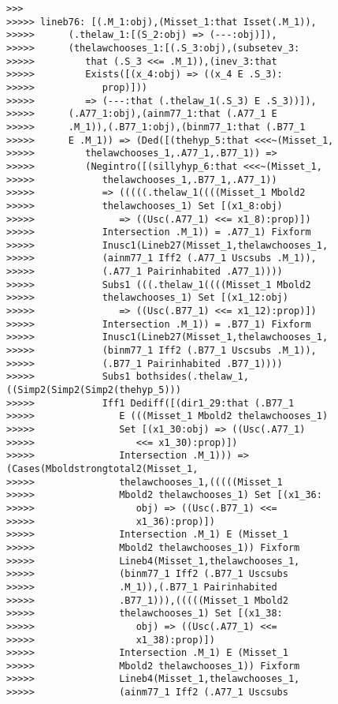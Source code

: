 \documentclass[12pt]{article}
\begin{document}
\begin{verbatim}
>>>
>>>>> lineb76: [(.M_1:obj),(Misset_1:that Isset(.M_1)),
>>>>>      (.thelaw_1:[(S_2:obj) => (---:obj)]),
>>>>>      (thelawchooses_1:[(.S_3:obj),(subsetev_3:
>>>>>         that (.S_3 <<= .M_1)),(inev_3:that
>>>>>         Exists([(x_4:obj) => ((x_4 E .S_3):
>>>>>            prop)]))
>>>>>         => (---:that (.thelaw_1(.S_3) E .S_3))]),
>>>>>      (.A77_1:obj),(ainm77_1:that (.A77_1 E
>>>>>      .M_1)),(.B77_1:obj),(binm77_1:that (.B77_1
>>>>>      E .M_1)) => (Ded([(thehyp_5:that <<<~(Misset_1,
>>>>>         thelawchooses_1,.A77_1,.B77_1)) =>
>>>>>         (Negintro([(sillyhyp_6:that <<<~(Misset_1,
>>>>>            thelawchooses_1,.B77_1,.A77_1))
>>>>>            => (((((.thelaw_1((((Misset_1 Mbold2
>>>>>            thelawchooses_1) Set [(x1_8:obj)
>>>>>               => ((Usc(.A77_1) <<= x1_8):prop)])
>>>>>            Intersection .M_1)) = .A77_1) Fixform
>>>>>            Inusc1(Lineb27(Misset_1,thelawchooses_1,
>>>>>            (ainm77_1 Iff2 (.A77_1 Uscsubs .M_1)),
>>>>>            (.A77_1 Pairinhabited .A77_1))))
>>>>>            Subs1 (((.thelaw_1((((Misset_1 Mbold2
>>>>>            thelawchooses_1) Set [(x1_12:obj)
>>>>>               => ((Usc(.B77_1) <<= x1_12):prop)])
>>>>>            Intersection .M_1)) = .B77_1) Fixform
>>>>>            Inusc1(Lineb27(Misset_1,thelawchooses_1,
>>>>>            (binm77_1 Iff2 (.B77_1 Uscsubs .M_1)),
>>>>>            (.B77_1 Pairinhabited .B77_1))))
>>>>>            Subs1 bothsides(.thelaw_1,((Simp2(Simp2(Simp2(thehyp_5)))
>>>>>            Iff1 Dediff([(dir1_29:that (.B77_1
>>>>>               E (((Misset_1 Mbold2 thelawchooses_1)
>>>>>               Set [(x1_30:obj) => ((Usc(.A77_1)
>>>>>                  <<= x1_30):prop)])
>>>>>               Intersection .M_1))) => (Cases(Mboldstrongtotal2(Misset_1,
>>>>>               thelawchooses_1,(((((Misset_1
>>>>>               Mbold2 thelawchooses_1) Set [(x1_36:
>>>>>                  obj) => ((Usc(.B77_1) <<=
>>>>>                  x1_36):prop)])
>>>>>               Intersection .M_1) E (Misset_1
>>>>>               Mbold2 thelawchooses_1)) Fixform
>>>>>               Lineb4(Misset_1,thelawchooses_1,
>>>>>               (binm77_1 Iff2 (.B77_1 Uscsubs
>>>>>               .M_1)),(.B77_1 Pairinhabited
>>>>>               .B77_1))),(((((Misset_1 Mbold2
>>>>>               thelawchooses_1) Set [(x1_38:
>>>>>                  obj) => ((Usc(.A77_1) <<=
>>>>>                  x1_38):prop)])
>>>>>               Intersection .M_1) E (Misset_1
>>>>>               Mbold2 thelawchooses_1)) Fixform
>>>>>               Lineb4(Misset_1,thelawchooses_1,
>>>>>               (ainm77_1 Iff2 (.A77_1 Uscsubs

\end{verbatim}
\end{document}
